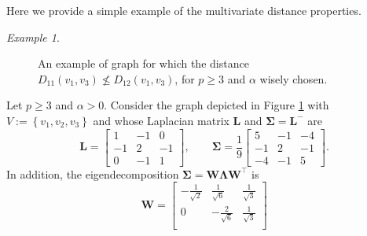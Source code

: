 \documentclass[12pt]{article}
\theoremstyle{plain}
\theoremstyle{remark}
\newtheorem*{example}{Example}
\newcommand{\curly}[1]{\left\{ #1 \right\}}
\newcommand{\latMatr}[1]{\mathbf{#1}}          %
\newcommand{\grMatr}[1]{{\boldsymbol{#1}}}   %
\begin{document}
    Here we provide a simple example of the multivariate distance properties.
    \begin{example}
        \label{ex:counterExampleDistance}
        \begin{figure}
            \centering
            \caption{An example of graph for which the distance $D_{11}(v_1,v_3) \not \leq D_{12}(v_1,v_3)$, for $p\geq 3$ and $\alpha$ wisely chosen.}
            \label{fig:counterExampleGraph}
        \end{figure}
        Let $p\geq 3$ and $\alpha>0$. Consider the graph depicted in Figure \ref{fig:counterExampleGraph} with $V:=\curly{v_1,v_2,v_3}$ and whose Laplacian matrix $\latMatr{L}$ and $\grMatr{\Sigma}={\latMatr{L}}^-$ are 
        \begin{equation*}
            \latMatr{L}=\begin{bmatrix}
                1 & -1 & 0\\
                -1 & 2 & -1\\
                0 & -1 & 1
            \end{bmatrix},
            \qquad
            {\grMatr{\Sigma}}=\frac{1}{9}\begin{bmatrix}
                5 & -1 & -4\\
                -1 & 2 & -1\\
                -4 & -1 & 5
            \end{bmatrix}.
        \end{equation*}
        In addition, the eigendecomposition ${\grMatr{\Sigma}}={\latMatr{W}} {\grMatr{\Lambda}} {\latMatr{W}}^\top$ is
        \begin{equation*}
            {\latMatr{W}}=\begin{bmatrix}
                -\frac{1}{\sqrt{2}} & \frac{1}{\sqrt{6}} & \frac{1}{\sqrt{3}} \\
                0 & -\frac{2}{\sqrt{6}} & \frac{1}{\sqrt{3}}\\

\end{bmatrix}
\end{equation*}
\end{example}
\end{document}
